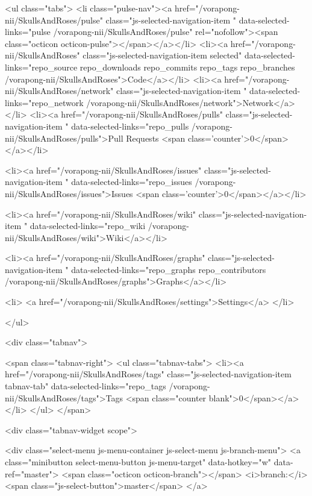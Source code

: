             
  <ul class="tabs">
    <li class="pulse-nav"><a href="/vorapong-nii/SkullsAndRoses/pulse" class="js-selected-navigation-item " data-selected-links="pulse /vorapong-nii/SkullsAndRoses/pulse" rel="nofollow"><span class="octicon octicon-pulse"></span></a></li>
    <li><a href="/vorapong-nii/SkullsAndRoses" class="js-selected-navigation-item selected" data-selected-links="repo_source repo_downloads repo_commits repo_tags repo_branches /vorapong-nii/SkullsAndRoses">Code</a></li>
    <li><a href="/vorapong-nii/SkullsAndRoses/network" class="js-selected-navigation-item " data-selected-links="repo_network /vorapong-nii/SkullsAndRoses/network">Network</a></li>
    <li><a href="/vorapong-nii/SkullsAndRoses/pulls" class="js-selected-navigation-item " data-selected-links="repo_pulls /vorapong-nii/SkullsAndRoses/pulls">Pull Requests <span class='counter'>0</span></a></li>

      <li><a href="/vorapong-nii/SkullsAndRoses/issues" class="js-selected-navigation-item " data-selected-links="repo_issues /vorapong-nii/SkullsAndRoses/issues">Issues <span class='counter'>0</span></a></li>

      <li><a href="/vorapong-nii/SkullsAndRoses/wiki" class="js-selected-navigation-item " data-selected-links="repo_wiki /vorapong-nii/SkullsAndRoses/wiki">Wiki</a></li>


    <li><a href="/vorapong-nii/SkullsAndRoses/graphs" class="js-selected-navigation-item " data-selected-links="repo_graphs repo_contributors /vorapong-nii/SkullsAndRoses/graphs">Graphs</a></li>

      <li>
        <a href="/vorapong-nii/SkullsAndRoses/settings">Settings</a>
      </li>

  </ul>
  
<div class="tabnav">

  <span class="tabnav-right">
    <ul class="tabnav-tabs">
          <li><a href="/vorapong-nii/SkullsAndRoses/tags" class="js-selected-navigation-item tabnav-tab" data-selected-links="repo_tags /vorapong-nii/SkullsAndRoses/tags">Tags <span class="counter blank">0</span></a></li>
    </ul>
  </span>

  <div class="tabnav-widget scope">


    <div class="select-menu js-menu-container js-select-menu js-branch-menu">
      <a class="minibutton select-menu-button js-menu-target" data-hotkey="w" data-ref="master">
        <span class="octicon octicon-branch"></span>
        <i>branch:</i>
        <span class="js-select-button">master</span>
      </a>

